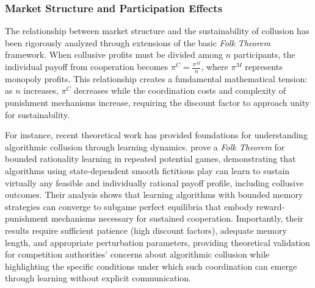 \subsubsection*{Market Structure and Participation Effects}

The relationship between market structure and the sustainability of collusion has been rigorously analyzed through extensions of the basic \emph{Folk Theorem} framework. When collusive profits must be divided among $n$ participants, the individual payoff from cooperation becomes $\pi^C = \frac{\pi^M}{n}$, where $\pi^M$ represents monopoly profits. This relationship creates a fundamental mathematical tension: as $n$ increases, $\pi^C$ decreases while the coordination costs and complexity of punishment mechanisms increase, requiring the discount factor to approach unity for sustainability.

For instance, recent theoretical work has provided foundations for understanding algorithmic collusion through learning dynamics. \textcite{cartea_algorithmic_2022} prove a \emph{Folk Theorem} for bounded rationality learning in repeated potential games, demonstrating that algorithms using state-dependent smooth fictitious play can learn to sustain virtually any feasible and individually rational payoff profile, including collusive outcomes. Their analysis shows that learning algorithms with bounded memory strategies can converge to subgame perfect equilibria that embody reward-punishment mechanisms necessary for sustained cooperation. Importantly, their results require sufficient patience (high discount factors), adequate memory length, and appropriate perturbation parameters, providing theoretical validation for competition authorities' concerns about algorithmic collusion while highlighting the specific conditions under which such coordination can emerge through learning without explicit communication.

